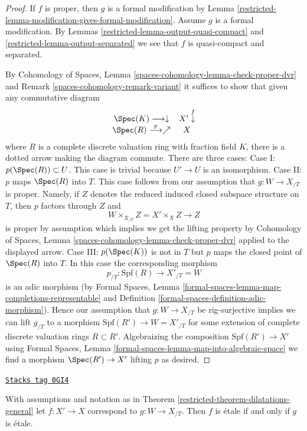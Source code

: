 \begin{proof}

If $f$ is proper, then $g$ is a formal modification by
Lemma \ref{restricted-lemma-modification-gives-formal-modification}.
Assume $g$ is a formal modification. By
Lemmas \ref{restricted-lemma-output-quasi-compact} and \ref{restricted-lemma-output-separated}
we see that $f$ is quasi-compact and separated.

\medskip\noindent
By Cohomology of Spaces, Lemma \ref{spaces-cohomology-lemma-check-proper-dvr}
and Remark \ref{spaces-cohomology-remark-variant}
it suffices to show that given any commutative diagram
$$
\begin{array}{cc}\Spec(K) \longrightarrow\downarrow & X' \overset{f}{\downarrow} \\ \Spec(R) \overset{p}{\longrightarrow}\nearrow & X\end{array}
$$
where $R$ is a complete discrete valuation ring with fraction field $K$,
there is a dotted arrow making the diagram commute.
There are three cases:
Case I: $p(\Spec(R)) \subset U$. This case is trivial
because $U' \to U$ is an isomorphism.
Case II: $p$ maps $\Spec(R)$ into $T$. This case follows
from our assumption that $g : W \to X_{/T}$ is proper. Namely,
if $Z$ denotes the reduced induced closed subspace structure
on $T$, then $p$ factors through $Z$ and
$$
W \times_{X_{/T}} Z = X' \times_X Z \longrightarrow Z
$$
is proper by assumption which implies we get the lifting property by
Cohomology of Spaces, Lemma \ref{spaces-cohomology-lemma-check-proper-dvr}
applied to the displayed arrow. Case III: $p(\Spec(K))$ is not in $T$
but $p$ maps the closed point of $\Spec(R)$ into $T$. In this case
the corresponding morphism
$$
p_{/T} : \text{Spf}(R) \longrightarrow X'_{/T} = W
$$
is an adic morphism (by
Formal Spaces, Lemma
\ref{formal-spaces-lemma-map-completions-representable} and
Definition \ref{formal-spaces-definition-adic-morphism}).
Hence our assumption that $g : W \to X_{/T}$ be rig-surjective
implies we can lift $g_{/T}$ to a morphism
$\text{Spf}(R') \to W = X'_{/T}$
for some extension of complete discrete valuation rings $R \subset R'$.
Algebraizing the composition $\text{Spf}(R') \to X'$ using
Formal Spaces, Lemma \ref{formal-spaces-lemma-map-into-algebraic-space}
we find a morphism $\Spec(R') \to X'$ lifting $p$ as desired.
\end{proof}

\begin{lemma}
\label{restricted-lemma-output-etale}
\href{https://stacks.math.columbia.edu/tag/0GI4}{\texttt{Stacks tag 0GI4}}

With assumptions and notation as in Theorem \ref{restricted-theorem-dilatations-general}
let $f : X' \to X$ correspond to $g : W \to X_{/T}$.
Then $f$ is \'etale if and only if $g$ is \'etale.
\end{lemma}

